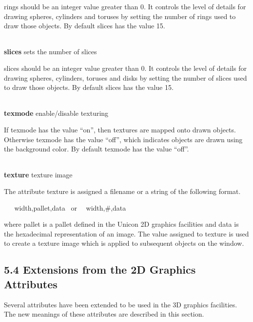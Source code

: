 \documentclass[letterpaper]{article}
\begin{document}
rings should be an integer value greater than 0. It controls the level
of details for drawing spheres, cylinders and toruses by setting the
number of rings used to draw those objects. By default slices has the
value 15.


\bigskip

\noindent\hrulefill\\
\noindent\textsf{\textbf{slices}} \hfill sets the number of slices


\bigskip

slices should be an integer value greater than 0. It controls the
level of details for drawing spheres, cylinders, toruses and disks by
setting the number of slices used to draw those objects. By default
slices has the value 15.


\bigskip

\noindent\hrulefill\\
\noindent\textsf{\textbf{texmode}} \hfill enable/disable texturing


\bigskip

If texmode has the value \textsf{{}``on'',} then textures are mapped
onto drawn objects. Otherwise texmode has the value
\textsf{{}``off''}, which indicates objects are drawn using the
background color. By default texmode has the value \textsf{{}``off''.}

\noindent\hrulefill\\
\noindent\textsf{\textbf{texture}} \hfill texture image


\bigskip

\noindent
The attribute texture is assigned a filename or a string of the
following format.

\texttt{\ \ \ }\textsf{width,pallet,data} \ or \ \ \textsf{width,\#,data}

\noindent
where \textsf{pallet} is a pallet defined in the Unicon 2D graphics
facilities and data is the hexadecimal representation of an image.
The value assigned to texture is used to create a texture image
which is applied to subsequent objects on the window.


\subsection[5.4 Extensions from the 2D Graphics Attributes]
{5.4 Extensions from the 2D Graphics Attributes}


\bigskip

Several attributes have been extended to be used in the 3D graphics
facilities. The new meanings of these attributes are described in
this section.
\end{document}
